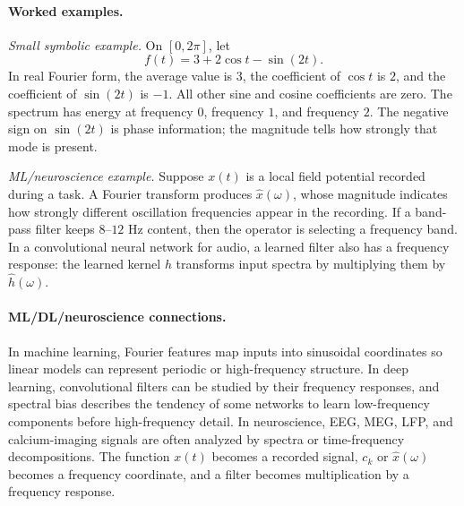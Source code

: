 \paragraph{Worked examples.}
\emph{Small symbolic example.} On \([0,2\pi]\), let
\[
f(t)=3+2\cos t-\sin(2t).
\]
In real Fourier form, the average value is \(3\), the coefficient of \(\cos t\) is \(2\), and the coefficient of \(\sin(2t)\) is \(-1\). All other sine and cosine coefficients are zero. The spectrum has energy at frequency \(0\), frequency \(1\), and frequency \(2\). The negative sign on \(\sin(2t)\) is phase information; the magnitude tells how strongly that mode is present.

\emph{ML/neuroscience example.} Suppose \(x(t)\) is a local field potential recorded during a task. A Fourier transform produces \(\widehat x(\omega)\), whose magnitude indicates how strongly different oscillation frequencies appear in the recording. If a band-pass filter keeps \(8\)--\(12\) Hz content, then the operator is selecting a frequency band. In a convolutional neural network for audio, a learned filter also has a frequency response: the learned kernel \(h\) transforms input spectra by multiplying them by \(\widehat h(\omega)\).

\paragraph{ML/DL/neuroscience connections.}
In machine learning, Fourier features map inputs into sinusoidal coordinates so linear models can represent periodic or high-frequency structure. In deep learning, convolutional filters can be studied by their frequency responses, and spectral bias describes the tendency of some networks to learn low-frequency components before high-frequency detail. In neuroscience, EEG, MEG, LFP, and calcium-imaging signals are often analyzed by spectra or time-frequency decompositions. The function \(x(t)\) becomes a recorded signal, \(c_k\) or \(\widehat x(\omega)\) becomes a frequency coordinate, and a filter becomes multiplication by a frequency response.

